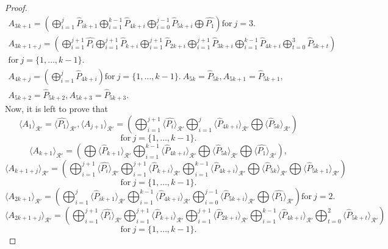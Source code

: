 \documentclass{amsart}
\theoremstyle{definition}
\theoremstyle{remark}
\numberwithin{equation}{section}
\begin{document}
\begin{proof}
\begin{gather*}
         A_{3k+1} =  \left( \bigoplus_{i=1}^{j}  \hat{P}_{ik+1}  \bigoplus_{i=1}^{k-1}  \hat{P}_{4k+i} \bigoplus_{i=0}^{j-1}  \hat{P}_{5k+i} \bigoplus  \hat{P_{1}}   \right) \text{for} ~ j =3. \\
         A_{3k+1+j} = \left( \bigoplus_{i=1}^{j+1} \hat{P_{i}}  \bigoplus_{i=1}^{j+1}  \hat{P}_{k+i}   \bigoplus_{i=1}^{j+1}  \hat{P}_{2k+i}  \bigoplus_{i=1}^{j+1}  \hat{P}_{3k+i}  \bigoplus_{i=1}^{k-1}  \hat{P}_{4k+i}  \bigoplus_{t=0}^{3} \hat{P}_{5k+t}    \right) \\ \text{for}~ j = \{1,\dots,k-1\}. \\
         A_{4k+j} = \left( \bigoplus_{i=1}^{j} \hat{P}_{4k+i}  \right) \text{for}~ j = \{1,\dots,k-1\}.~ A_{5k}=  \hat{P}_{5k}, A_{5k+1}=  \hat{P}_{5k+1}, \\ A_{5k+2}=  \hat{P}_{5k+2}, A_{5k+3}=   \hat{P}_{5k+3}.
    \end{gather*}
    Now, it is left to prove that
    \allowdisplaybreaks
        $$\langle A_1 \rangle_{\mathcal{R}'} = \langle \hat{P_{1}} \rangle_{\mathcal{R}'},\langle  A_{j+1} \rangle_{\mathcal{R}'} = \left( \bigoplus_{i=1}^{j+1} \langle \hat{P_i} \rangle_{\mathcal{R}'} \bigoplus_{i=1}^{j} \langle \hat{P}_{4k+i} \rangle_{\mathcal{R}'} \bigoplus \langle \hat{P}_{5k} \rangle_{\mathcal{R}'}  \right) $$  $$\text{for} ~ j = \{1,\dots,k-1\}.$$ 
        $$ \langle  A_{k+1} \rangle_{\mathcal{R}'} = \left( \bigoplus \langle \hat{P}_{k+1} \rangle_{\mathcal{R}'} \bigoplus_{i=1}^{k-1} \langle \hat{P}_{4k+i} \rangle_{\mathcal{R}'} \bigoplus \langle \hat{P}_{5k} \rangle_{\mathcal{R}'} \bigoplus \langle \hat{P_{1}} \rangle_{\mathcal{R}'}  \right), $$
       $$ \langle  A_{k+1+j} \rangle_{\mathcal{R}'} = \left( \bigoplus_{i=1}^{j+1} \langle \hat{P_{i}} \rangle_{\mathcal{R}'} \bigoplus_{i=1}^{j+1} \langle \hat{P}_{k+i} \rangle_{\mathcal{R}'} \bigoplus_{i=1}^{k-1} \langle \hat{P}_{4k+i} \rangle_{\mathcal{R}'} \bigoplus \langle \hat{P}_{5k} \rangle_{\mathcal{R}'} \bigoplus \langle \hat{P}_{5k+1} \rangle_{\mathcal{R}'}  \right) $$ $$ \text{for} ~ j = \{1,\dots,k-1\}. $$ 
       $$ \langle  A_{2k+1} \rangle_{\mathcal{R}'} =   \left( \bigoplus_{i=1}^{j} \langle \hat{P}_{ik+1} \rangle_{\mathcal{R}'} \bigoplus_{i=1}^{k-1} \langle \hat{P}_{4k+i} \rangle_{\mathcal{R}'} \bigoplus_{i=0}^{j-1} \langle \hat{P}_{5k+i} \rangle_{\mathcal{R}'} \bigoplus \langle \hat{P_{1}} \rangle_{\mathcal{R}'}  \right) \text{for} ~ j =2.$$ 
       $$ \langle  A_{2k+1+j} \rangle_{\mathcal{R}'} = \left( \bigoplus_{i=1}^{j+1} \langle \hat{P_{i}} \rangle_{\mathcal{R}'} \bigoplus_{i=1}^{j+1} \langle \hat{P}_{k+i} \rangle_{\mathcal{R}'}  \bigoplus_{i=1}^{j+1} \langle \hat{P}_{2k+i} \rangle_{\mathcal{R}'} \bigoplus_{i=1}^{k-1} \langle \hat{P}_{4k+i} \rangle_{\mathcal{R}'} \bigoplus_{t=0}^{2} \langle \hat{P}_{5k+t} \rangle_{\mathcal{R}'}   \right) $$  $$\text{for} ~ j = \{1,\dots,k-1\}. $$

\end{proof}
\end{document}
